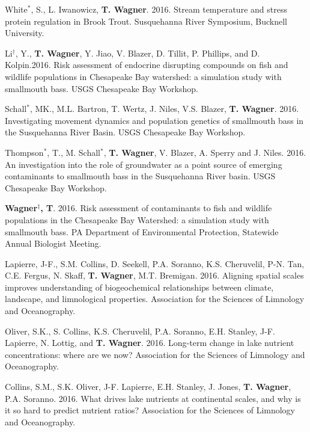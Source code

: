 \documentclass[10pt]{article}
\begin{document}
\begin{flushleft}
\begin{etaremune}
\item White$^*$, S., L. Iwanowicz, {\bf T. Wagner}. 2016. Stream temperature and stress protein regulation in Brook Trout. Susquehanna River Symposium, Bucknell University. 

\item Li$^\dagger$, Y.,  {\bf T. Wagner}, Y. Jiao, V. Blazer, D. Tillit, P. Phillips, and D. Kolpin.2016. Risk assessment of endocrine disrupting compounds on fish and wildlife populations in Chesapeake Bay watershed: a simulation study with smallmouth bass. USGS Chesapeake Bay Workshop.

\item Schall$^*$, MK., M.L. Bartron, T. Wertz, J. Niles, V.S. Blazer, {\bf T. Wagner}. 2016. Investigating movement dynamics and population genetics of smallmouth bass in the Susquehanna River Basin. USGS Chesapeake Bay Workshop.

Thompson$^*$, T., M. Schall$^*$, {\bf T. Wagner}, V. Blazer, A. Sperry and J. Niles. 2016. An investigation into the role of groundwater as a point source of emerging contaminants to smallmouth bass in the Susquehanna River basin. USGS Chesapeake Bay Workshop.

 \item {\bf Wagner$^\ddagger$, T}. 2016. Risk assessment of contaminants to fish and wildlife populations in the Chesapeake Bay Watershed: a simulation study with smallmouth bass. PA Department of Environmental Protection, Statewide Annual Biologist Meeting.

\item Lapierre, J-F., S.M. Collins, D. Seekell, P.A. Soranno, K.S. Cheruvelil, P-N. Tan, C.E. Fergus, N. Skaff,  {\bf T. Wagner}, M.T. Bremigan. 2016. Aligning spatial scales improves understanding of biogeochemical relationships between climate, landscape, and limnological properties. Association for the Sciences of Limnology and Oceanography.

\item Oliver, S.K., S. Collins, K.S. Cheruvelil, P.A. Soranno, E.H. Stanley, J-F. Lapierre, N. Lottig, and  {\bf T. Wagner}. 2016. Long-term change in lake nutrient concentrations: where are we now? Association for the Sciences of Limnology and Oceanography. 

\item Collins, S.M., S.K. Oliver, J-F. Lapierre, E.H. Stanley, J. Jones,  {\bf T. Wagner}, P.A. Soranno. 2016. What drives lake nutrients at continental scales, and why is it so hard to predict nutrient ratios? Association for the Sciences of Limnology and Oceanography. 


\end{etaremune}
\end{flushleft}
\end{document}

